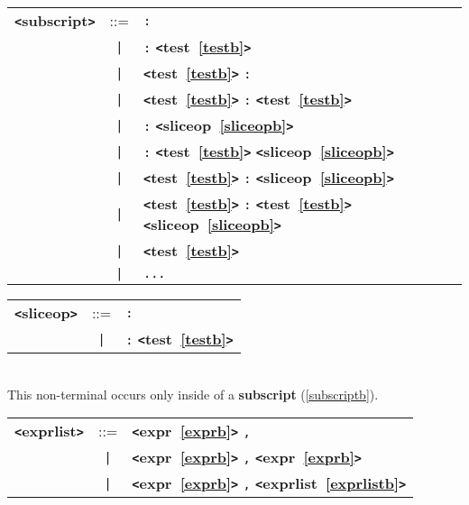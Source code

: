 \label{subscriptb}
\begin{tabular}{lcl}
{\bf \verb+<+subscript\verb+>+} & ::=  & \verb|:| \\
 & \verb+|+  & \verb|:| {\bf \verb+<+test~\ref{testb}\verb+>+}  \\
 & \verb+|+  & {\bf \verb+<+test~\ref{testb}\verb+>+}  \verb|:| \\
 & \verb+|+  & {\bf \verb+<+test~\ref{testb}\verb+>+}  \verb|:| {\bf \verb+<+test~\ref{testb}\verb+>+}  \\
 & \verb+|+  & \verb|:| {\bf \verb+<+sliceop~\ref{sliceopb}\verb+>+}  \\
 & \verb+|+  & \verb|:| {\bf \verb+<+test~\ref{testb}\verb+>+}  {\bf \verb+<+sliceop~\ref{sliceopb}\verb+>+}  \\
 & \verb+|+  & {\bf \verb+<+test~\ref{testb}\verb+>+}  \verb|:| {\bf \verb+<+sliceop~\ref{sliceopb}\verb+>+}  \\
 & \verb+|+  & {\bf \verb+<+test~\ref{testb}\verb+>+}  \verb|:| {\bf \verb+<+test~\ref{testb}\verb+>+}  {\bf \verb+<+sliceop~\ref{sliceopb}\verb+>+}  \\
 & \verb+|+  & {\bf \verb+<+test~\ref{testb}\verb+>+}  \\
 & \verb+|+  & \verb|...| \\
\end{tabular}

\label{sliceopb}
\begin{tabular}{lcl}
{\bf \verb+<+sliceop\verb+>+} & ::=  & \verb|:| \\
 & \verb+|+  & \verb|:| {\bf \verb+<+test~\ref{testb}\verb+>+}  \\
\end{tabular} \\

This non-terminal occurs only inside of a {\bf subscript} (\ref{subscriptb}).

\label{exprlistb}
\begin{tabular}{lcl}
{\bf \verb+<+exprlist\verb+>+} & ::=  & {\bf \verb+<+expr~\ref{exprb}\verb+>+}  \verb|,| \\
 & \verb+|+  & {\bf \verb+<+expr~\ref{exprb}\verb+>+}  \verb|,| {\bf \verb+<+expr~\ref{exprb}\verb+>+}  \\
 & \verb+|+  & {\bf \verb+<+expr~\ref{exprb}\verb+>+}  \verb|,| {\bf \verb+<+exprlist~\ref{exprlistb}\verb+>+}  \\
\end{tabular}

